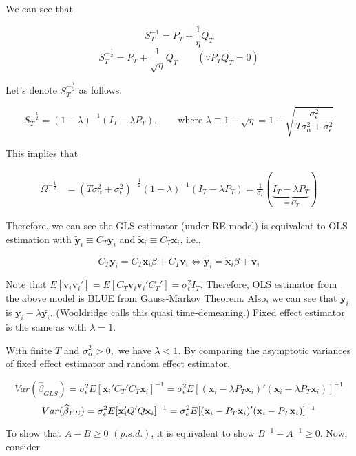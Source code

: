 \documentclass[12pt]{article}
\begin{document}
We can see that 

\[
S_T^{-1} = P_T +\frac{1}{\eta} Q_T
\]
\[
S_T^{-\frac{1}{2}} = P_T + \frac{1}{\sqrt{\eta}} Q_T \qquad (\because P_T Q_T = 0)
\]

Let's denote $S_T^{-\frac{1}{2}}$ as follows:

\[
S_T^{-\frac{1}{2}} = (1-\lambda)^{-1} (I_T - \lambda P_T), \qquad \text{where} \,\, \lambda \equiv 1-\sqrt{\eta} = 1-  \sqrt{\frac{\sigma_\epsilon^2}{T\sigma_\alpha^2 + \sigma_\epsilon^2}}
\]


This implies that 

\begin{align*}
\Omega^{-\frac{1}{2}} & = (T\sigma_\alpha^2 + \sigma_\epsilon^2)^{-\frac{1}{2}} (1-\lambda)^{-1} (I_T - \lambda P_T ) = \frac{1}{\sigma_\epsilon} (\underbrace{I_T -\lambda P_T}_{\equiv C_T} ) 
\end{align*}

Therefore, we can see the GLS estimator (under RE model) is equivalent to OLS estimation with $\widetilde{\mathbf{y}}_i \equiv C_T \mathbf{y}_i$ and $\widetilde{\mathbf{x}}_i \equiv C_T \mathbf{x}_i$, i.e.,

\[
C_T \mathbf{y}_i =C_T \mathbf{x}_i \beta + C_T \mathbf{v}_i  \Leftrightarrow \widetilde{\mathbf{y}}_i=\widetilde{\mathbf{x}}_i \beta + \widetilde{\mathbf{v}}_i
\] 

Note that $ E[\widetilde{\mathbf{v}}_i \widetilde{\mathbf{v}}_i'] = E[C_T \mathbf{v}_i \mathbf{v}_i' C_T'] = \sigma_\epsilon^2 I_T$. Therefore, OLS estimator from the above model is BLUE from Gauss-Markov Theorem. Also, we can see that $\widetilde{\mathbf{y}}_i$ is $\mathbf{y}_i - \lambda \bar{\mathbf{y}_i} $. (Wooldridge calls this quasi time-demeaning.) Fixed effect estimator is the same as with $\lambda =1$. 

With finite $T$ and $\sigma_\alpha^2 >0,$ we have $\lambda<1$. By comparing the asymptotic variances of fixed effect estimator and random effect estimator, 

\[
Var(\widehat{\beta}_{GLS}) = \sigma_\epsilon^2 E[\mathbf{x}_i' C_T'C_T \mathbf{x}_i]^{-1} = \sigma_\epsilon^2 E[(\mathbf{x}_i - \lambda P_T \mathbf{x}_i)'(\mathbf{x}_i - \lambda P_T \mathbf{x}_i)]^{-1}
\] 
\[
Var(\widehat{\beta}_{FE}) = \sigma_\epsilon^2 E[\mathbf{x}_i' Q'Q \mathbf{x}_i]^{-1} = \sigma_\epsilon^2 E[(\mathbf{x}_i - P_T \mathbf{x}_i)'(\mathbf{x}_i - P_T \mathbf{x}_i)]^{-1}\\
\] 


To show that $A-B \geq 0\,\, (p.s.d.)$, it is equivalent to show $B^{-1} - A^{-1} \geq 0$. Now, consider
\end{document}
